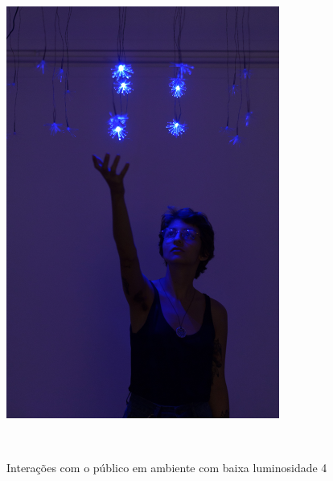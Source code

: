 \begin{apendicesenv}
\begin{figure}[H]
  \begin{center}
    \caption{Interações com o público em ambiente com baixa luminosidade 4}
    \vspace*{0,2cm}
    \includegraphics[width=0.8\textwidth]{./04-figuras/instalacao_4}
    \label{fig:instalacao_4}
  \end{center}
  \vspace*{-0,9cm}
  \\
\end{figure}


\end{apendicesenv}
